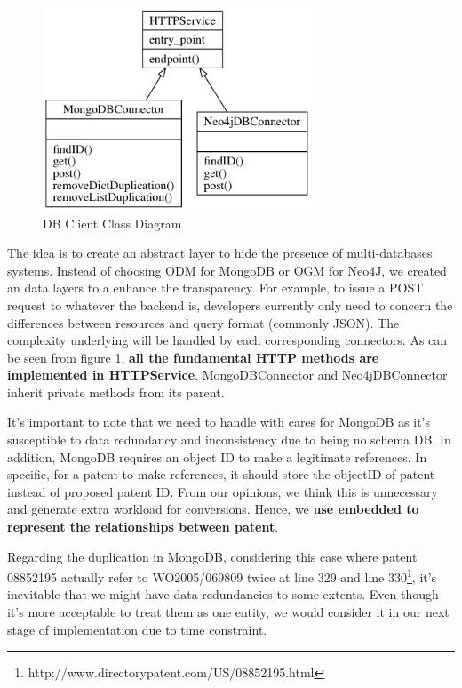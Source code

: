 \documentclass{article}
\begin{document}
\begin{figure}[H]
\centering
\includegraphics[width=80mm,scale=10]{db_client.png}
\caption{ DB Client Class Diagram \label{fig:db_client}}
\end{figure}

The idea is to create an abstract layer to hide the presence of multi-databases systems. Instead of choosing ODM for MongoDB or OGM for Neo4J, we created an data layers to a enhance the transparency. For example, to issue a POST request to whatever the backend is, developers currently only need to concern the differences between resources and query format (commonly JSON). The complexity underlying will be handled by each corresponding connectors. As can be seen from figure \ref{fig:db_client}, \textbf{all the fundamental HTTP methods are implemented in HTTPService}. MongoDBConnector and Neo4jDBConnector inherit private methods from its parent. 

It's important to note that we need to handle with cares for MongoDB as it's susceptible to data redundancy and inconsistency due to being no schema DB. In addition, MongoDB requires an object ID to make a legitimate references. In specific, for a patent to make references, it should store the objectID of patent instead of proposed patent ID. From our opinions, we think this is unnecessary and generate extra workload for conversions. Hence, we \textbf{use embedded to represent the relationships between patent}. 

Regarding the duplication in MongoDB, considering this case where patent 08852195 actually refer to WO2005/069809 twice at line 329 and line 330\footnote{http://www.directorypatent.com/US/08852195.html}, it's inevitable that we might have data redundancies to some extents. Even though it's more acceptable to treat them as one entity, we would consider it in our next stage of implementation due to time constraint.
\end{document}
